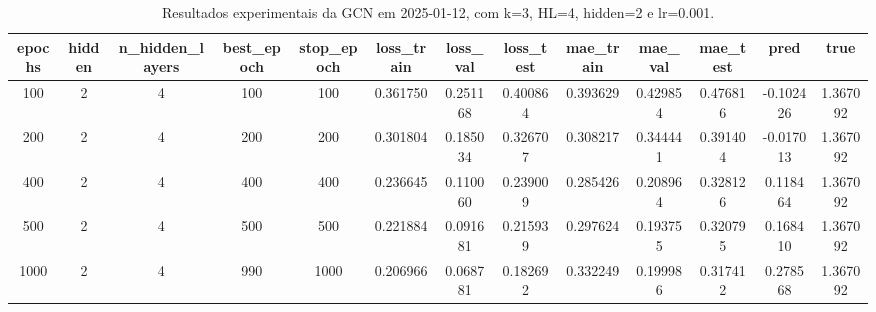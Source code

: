 \begin{table}[h]
\centering
\caption{Resultados experimentais da GCN em 2025-01-12, com k=3, HL=4, hidden=2 e lr=0.001.}
\label{tab:gcn_results_k3_hl4_h2_d20250112}
\begin{tabular}{ccccccccccccc}
\toprule
epochs & hidden & n\_hidden\_layers & best\_epoch & stop\_epoch & loss\_train & loss\_val & loss\_test & mae\_train & mae\_val & mae\_test & pred & true \\
\midrule
100 & 2 & 4 & 100 & 100 & 0.361750 & 0.251168 & 0.400864 & 0.393629 & 0.429854 & 0.476816 & -0.102426 & 1.367092 \\
200 & 2 & 4 & 200 & 200 & 0.301804 & 0.185034 & 0.326707 & 0.308217 & 0.344441 & 0.391404 & -0.017013 & 1.367092 \\
400 & 2 & 4 & 400 & 400 & 0.236645 & 0.110060 & 0.239009 & 0.285426 & 0.208964 & 0.328126 & 0.118464 & 1.367092 \\
500 & 2 & 4 & 500 & 500 & 0.221884 & 0.091681 & 0.215939 & 0.297624 & 0.193755 & 0.320795 & 0.168410 & 1.367092 \\
1000 & 2 & 4 & 990 & 1000 & 0.206966 & 0.068781 & 0.182692 & 0.332249 & 0.199986 & 0.317412 & 0.278568 & 1.367092 \\
\bottomrule
\end{tabular}
\end{table}
